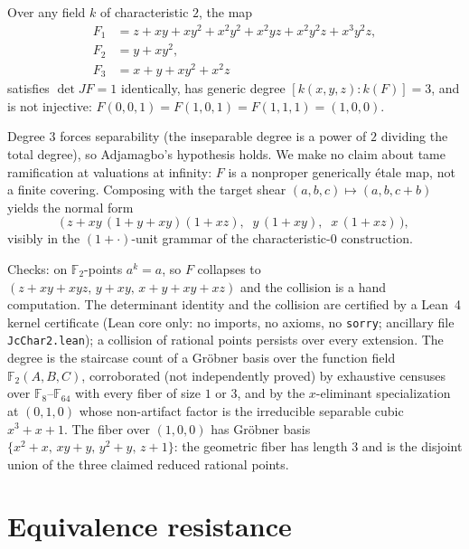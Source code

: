\documentclass[11pt]{amsart}
\newcommand{\F}{\mathbb{F}}
\begin{document}
\begin{theorem}
Over any field $k$ of characteristic $2$, the map
\begin{align*}
F_1 &= z + xy + xy^2 + x^2y^2 + x^2yz + x^2y^2z + x^3y^2z,\\
F_2 &= y + xy^2,\\
F_3 &= x + y + xy^2 + x^2z
\end{align*}
satisfies $\det JF = 1$ identically, has generic degree
$[k(x,y,z):k(F)] = 3$, and is not injective:
$F(0,0,1) = F(1,0,1) = F(1,1,1) = (1,0,0)$.
\end{theorem}

Degree $3$ forces separability (the inseparable degree is a power of
$2$ dividing the total degree), so Adjamagbo's hypothesis holds. We
make no claim about tame ramification at valuations at infinity: $F$ is
a nonproper generically \'etale map, not a finite covering. Composing
with the target shear $(a,b,c) \mapsto (a,b,c+b)$ yields the normal
form
\[
\bigl(\, z + xy\,(1+y+xy)(1+xz),\;\; y\,(1+xy),\;\; x\,(1+xz) \,\bigr),
\]
visibly in the $(1+\cdot)$-unit grammar of the characteristic-$0$
construction.

Checks: on $\F_2$-points $a^k = a$, so $F$ collapses to
$(z+xy+xyz,\, y+xy,\, x+y+xy+xz)$ and the collision is a hand
computation. The determinant identity and the collision are certified
by a Lean~4 kernel certificate (Lean core only: no imports, no axioms,
no \texttt{sorry}; ancillary file \texttt{JcChar2.lean}); a collision
of rational points persists over every extension. The degree is the
staircase count of a Gr\"obner basis over the function field
$\F_2(A,B,C)$, corroborated (not independently proved) by exhaustive
censuses over $\F_8$--$\F_{64}$ with every fiber of size $1$ or $3$,
and by the $x$-eliminant specialization at $(0,1,0)$ whose non-artifact
factor is the irreducible separable cubic $x^3+x+1$. The fiber over
$(1,0,0)$ has Gr\"obner basis $\{x^2{+}x,\, xy{+}y,\, y^2{+}y,\,
z{+}1\}$: the geometric fiber has length $3$ and is the disjoint union
of the three claimed reduced rational points.

\section{Equivalence resistance}
\end{document}
